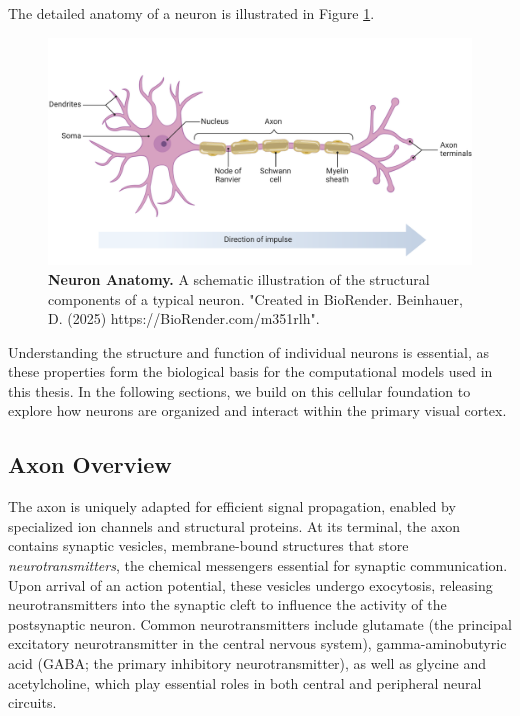 The detailed anatomy of a neuron is illustrated in Figure \ref{fig:neuron}.

\begin{figure}
    \centering
    \includegraphics[width=\linewidth]{img/neuron_anatomy.pdf}
    \caption{\textbf{Neuron Anatomy.} A schematic illustration of the structural components of a typical neuron. "Created in BioRender. Beinhauer, D. (2025) https://BioRender.com/m351rlh".}
    \label{fig:neuron}
\end{figure}

Understanding the structure and function of individual neurons is essential, as these properties form the biological basis for the computational models used in this thesis. In the following sections, we build on this cellular foundation to explore how neurons are organized and interact within the primary visual cortex.

\subsection{Axon Overview}
\label{subsec:axon}

The axon is uniquely adapted for efficient signal propagation, enabled by specialized ion channels and structural proteins. At its terminal, the axon contains synaptic vesicles, membrane-bound structures that store \emph{neurotransmitters}, the chemical messengers essential for synaptic communication. Upon arrival of an action potential, these vesicles undergo exocytosis, releasing neurotransmitters into the synaptic cleft to influence the activity of the postsynaptic neuron. Common neurotransmitters include glutamate (the principal excitatory neurotransmitter in the central nervous system), gamma-aminobutyric acid (GABA; the primary inhibitory neurotransmitter), as well as glycine and acetylcholine, which play essential roles in both central and peripheral neural circuits.


